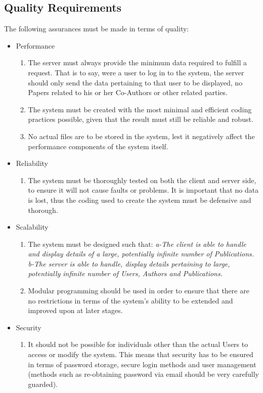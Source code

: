 \documentclass[hidelinks,a4paper,12pt]{article}
\begin{document}
\subsection{Quality Requirements}
The following assurances must be made in terms of quality:
\begin{itemize}
	\item Performance
	\begin{enumerate}
		\item The server must always provide the minimum data required to fulfill a request. That is to say, were a user to log in to the system, the server should only send the data pertaining to that user to be displayed, no Papers related to his or her Co-Authors or other related parties. 
		\item The system must be created with the most minimal and efficient coding practices possible, given that the result must still be reliable and robust.
		\item No actual files are to be stored in the system, lest it negatively affect the performance components of the system itself.
	\end{enumerate}
	\item Reliability
	\begin{enumerate}
		\item The system must be thoroughly tested on both the client and server side, to ensure it will not cause faults or problems. It is important that no data is lost, thus the coding used to create the system must be defensive and thorough.
	\end{enumerate}
	\newpage
	\item Scalability
	\begin{enumerate}
		\item The system must be designed such that:
		\newline
		\textit{	a-The client is able to handle and display details of a large, potentially infinite number of Publications.
			b-The server is able to handle, display details pertaining to large, potentially infinite number of Users, Authors and Publications.}	
		\item Modular programming should be used in order to ensure that there are no restrictions in terms of the system's ability to be extended and improved upon at later stages.
	\end{enumerate}
	\item Security
	\begin{enumerate}
		\item It should not be possible for individuals other than the actual Users to access or modify the system. This means that security has to be ensured in terms of password storage, secure login methods and user management (methods such as re-obtaining password via email should be very carefully guarded).

\end{enumerate}
\end{itemize}
\end{document}

